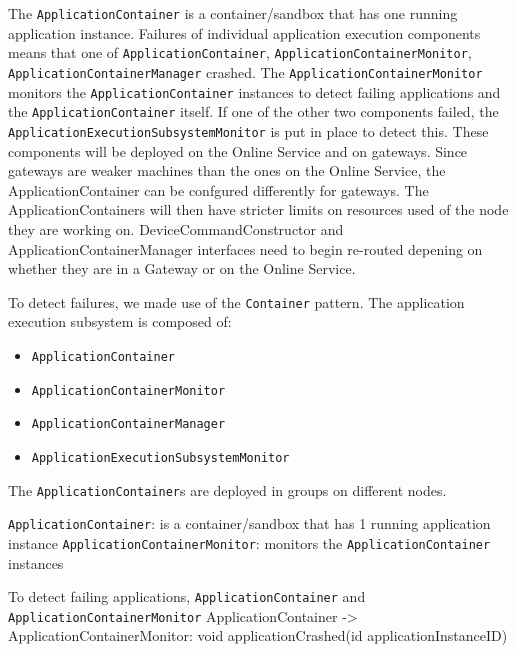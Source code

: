             The \texttt{ApplicationContainer} is a container/sandbox that has one running application instance.
            Failures of individual application execution components means that one of \texttt{ApplicationContainer}, \texttt{ApplicationContainerMonitor}, \texttt{ApplicationContainerManager} crashed.
            The \texttt{ApplicationContainerMonitor} monitors the \texttt{ApplicationContainer} instances
            to detect failing applications and the \texttt{ApplicationContainer} itself.
            If one of the other two components failed, the \texttt{ApplicationExecutionSubsystemMonitor} is put in place to detect this.
            These components will be deployed on the Online Service and on gateways.
            Since gateways are weaker machines than the ones on the Online Service,
            the ApplicationContainer can be confgured differently for gateways.
            The ApplicationContainers will then have stricter limits on
            resources used of the node they are working on.
            DeviceCommandConstructor and ApplicationContainerManager interfaces need to begin
            re-routed depening on whether they are in a Gateway or on the Online Service.

            To detect failures, we made use of the \texttt{Container} pattern.
            The application execution subsystem is composed of:
            \begin{itemize}
                \item \texttt{ApplicationContainer}
                \item \texttt{ApplicationContainerMonitor}
                \item \texttt{ApplicationContainerManager}
                \item \texttt{ApplicationExecutionSubsystemMonitor}
            \end{itemize}

            The \texttt{ApplicationContainer}s are deployed in groups on different nodes.

            \texttt{ApplicationContainer}: is a container/sandbox that has 1 running application instance
            \texttt{ApplicationContainerMonitor}: monitors the \texttt{ApplicationContainer} instances

            To detect failing applications, \texttt{ApplicationContainer} and \texttt{ApplicationContainerMonitor}
                ApplicationContainer -> ApplicationContainerMonitor: void applicationCrashed(id applicationInstanceID)

